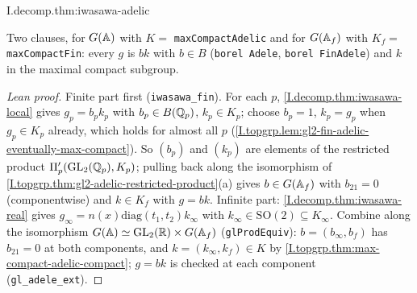\begin{theorem}
\end{theorem}
\begin{tfformal}{I.decomp.thm:iwasawa-adelic}
\begin{tffidelity}
Two clauses, for $G(\mathbb{A})$ with $K=$ \texttt{maxCompactAdelic} and for $G(\mathbb{A}_f)$ with $K_f=$ \texttt{maxCompactFin}: every $g$ is $bk$ with $b\in B$ (\texttt{borel Adele}, \texttt{borel FinAdele}) and $k$ in the maximal compact subgroup.
\end{tffidelity}
\end{tfformal}
\begin{proof}[Lean proof]
Finite part first (\texttt{iwasawa\_fin}). For each $p$, \cref{I.decomp.thm:iwasawa-local} gives $g_p=b_pk_p$ with $b_p\in B(\mathbb{Q}_p)$, $k_p\in K_p$; choose $b_p=1$, $k_p=g_p$ when $g_p\in K_p$ already, which holds for almost all $p$ (\cref{I.topgrp.lem:gl2-fin-adelic-eventually-max-compact}). So $(b_p)$ and $(k_p)$ are elements of the restricted product $\Pi'_p(\mathrm{GL}_2(\mathbb{Q}_p),K_p)$; pulling back along the isomorphism of \cref{I.topgrp.thm:gl2-adelic-restricted-product}(a) gives $b\in G(\mathbb{A}_f)$ with $b_{21}=0$ (componentwise) and $k\in K_f$ with $g=bk$. Infinite part: \cref{I.decomp.thm:iwasawa-real} gives $g_\infty=n(x)\mathrm{diag}(t_1,t_2)k_\infty$ with $k_\infty\in\mathrm{SO}(2)\subseteq K_\infty$. Combine along the isomorphism $G(\mathbb{A})\simeq\mathrm{GL}_2(\mathbb{R})\times G(\mathbb{A}_f)$ (\texttt{glProdEquiv}): $b=(b_\infty,b_f)$ has $b_{21}=0$ at both components, and $k=(k_\infty,k_f)\in K$ by \cref{I.topgrp.thm:max-compact-adelic-compact}; $g=bk$ is checked at each component (\texttt{gl\_adele\_ext}).
\end{proof}

